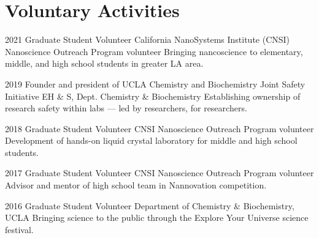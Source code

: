 \section{Voluntary Activities}

\begin{entrylist}
\entry
{2021}
{Graduate Student Volunteer}
{California NanoSystems Institute (CNSI) Nanoscience Outreach Program volunteer}
{Bringing nancoscience to elementary, middle, and high school students in greater LA area.}

\entry
{2019}
{Founder and president of UCLA Chemistry and Biochemistry Joint Safety Initiative}
{EH \& S, Dept. Chemistry \& Biochemistry}
{Establishing ownership of research safety within labs — led by researchers, for researchers.}

\entry
{2018}
{Graduate Student Volunteer}
{CNSI Nanoscience Outreach Program volunteer}
{Development of hands-on liquid crystal laboratory for middle and high school students.}

\entry
{2017}
{Graduate Student Volunteer}
{CNSI Nanoscience Outreach Program volunteer}
{Advisor and mentor of high school team in Nannovation competition.}

\entry
{2016}
{Graduate Student Volunteer}
{Department of Chemistry \& Biochemistry, UCLA}
{Bringing science to the public through the Explore Your Universe science festival.}
\end{entrylist}

